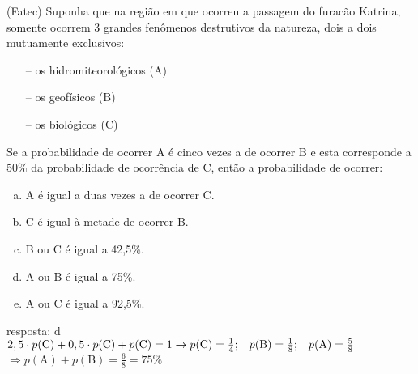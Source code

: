\begin{ex}
(Fatec) Suponha que na região em que ocorreu  a passagem do furacão Katrina, somente ocorrem 3 grandes fenômenos destrutivos da natureza, dois a dois mutuamente exclusivos:
   \begin{itemize}
   \item [--]  os hidromiteorológicos (A)
   \item [--]  os geofísicos (B)
   \item [--]  os biológicos (C)
   \end{itemize}
Se a probabilidade de ocorrer A é cinco vezes a de ocorrer B e esta corresponde a 50\% da probabilidade de ocorrência de C, então a probabilidade de ocorrer:
   \begin{enumerate}[(a)]
   \item  A é igual a duas vezes a de ocorrer C.
   \item  C é igual à metade de ocorrer B.  
   \item  B ou C é igual a 42,5\%.
   \item  A ou B é igual a 75\%.
   \item  A ou C é igual a 92,5\%.
   \end{enumerate}
     \begin{sol}
       resposta: d \\
       $2,5\cdot p(\mathrm{C})+0,5\cdot p(\mathrm{C})+p(\mathrm{C})=1\rightarrow p(\mathrm{C})=\frac{1}{4};\hspace{0,3cm} p(\mathrm{B})=\frac{1}{8};\hspace{0,3cm} p(\mathrm{A})=\frac{5}{8}$\\
       $\Longrightarrow p(\mathrm{A})+p(\mathrm{B})=\frac{6}{8}=75\%$
     \end{sol}
\end{ex}